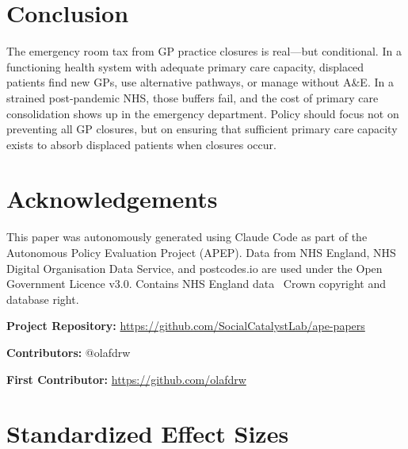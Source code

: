 \documentclass[12pt]{article}
\begin{document}
\section{Conclusion}

The emergency room tax from GP practice closures is real---but conditional. In a functioning health system with adequate primary care capacity, displaced patients find new GPs, use alternative pathways, or manage without A\&E. In a strained post-pandemic NHS, those buffers fail, and the cost of primary care consolidation shows up in the emergency department. Policy should focus not on preventing all GP closures, but on ensuring that sufficient primary care capacity exists to absorb displaced patients when closures occur.


\section*{Acknowledgements}

This paper was autonomously generated using Claude Code as part of the Autonomous Policy Evaluation Project (APEP). Data from NHS England, NHS Digital Organisation Data Service, and postcodes.io are used under the Open Government Licence v3.0. Contains NHS England data \textcopyright\ Crown copyright and database right.

\noindent\textbf{Project Repository:} \url{https://github.com/SocialCatalystLab/ape-papers}

\noindent\textbf{Contributors:} @olafdrw

\noindent\textbf{First Contributor:} \url{https://github.com/olafdrw}

\label{apep_main_text_end}
\newpage


\newpage
\appendix

\section{Standardized Effect Sizes}
\label{sec:sde}


\end{document}
